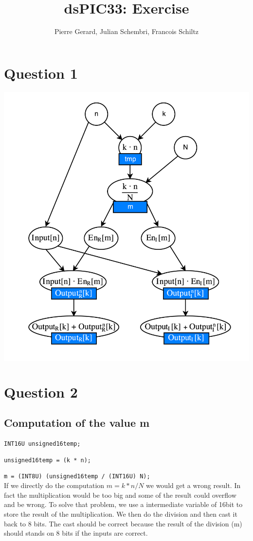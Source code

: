 \documentclass[a4paper]{article}
\title{dsPIC33: Exercise}
\author{Pierre Gerard, Julian Schembri, Francois Schiltz}
\begin{document}
\maketitle

\section{Question 1}

\includegraphics[scale=1]{files/elect-01.png} 

\section{Question 2}

\subsection{Computation of the value m}


\verb|INT16U unsigned16temp;|

\verb|unsigned16temp = (k * n);|

\verb|m = (INT8U) (unsigned16temp / (INT16U) N);|
\\

If we directly do the computation $ m = k*n/N $ we would get a wrong result. In fact the multiplication would be too big and some of the result could overflow and be wrong. To solve that problem, we use a intermediate variable of 16bit to store the result of the multiplication. We then do the division and then cast it back to 8 bits. The cast should be correct because the result of the division (m) should stands on 8 bits if the inputs are correct.
\end{document}
